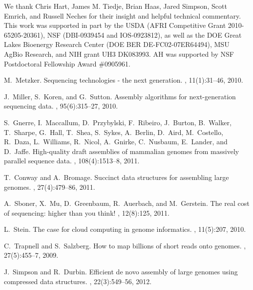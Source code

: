 \documentclass{pnastwo}
\begin{document}
\begin{article}
\begin{acknowledgments}
We thank Chris Hart, James M. Tiedje, Brian Haas, Jared Simpson, Scott
Emrich, and Russell Neches for their insight and helpful technical
commentary.  This work was supported in part by the USDA (AFRI
Competitive Grant 2010-65205-20361), NSF (DBI-0939454 and
IOS-0923812), as well as the DOE Great Lakes Bioenergy Research Center
(DOE BER DE-FC02-07ER64494), MSU AgBio Research, and NIH grant UH3
DK083993.  AH was supported by NSF Postdoctoral Fellowship Award
\#0905961.

\end{acknowledgments}

\begin{thebibliography}{10}

M.~Metzker.
\newblock Sequencing technologies - the next generation.
, 11(1):31--46, 2010.

J.~Miller, S.~Koren, and G.~Sutton.
\newblock Assembly algorithms for next-generation sequencing data.
, 95(6):315--27, 2010.

S.~Gnerre, I.~Maccallum, D.~Przybylski, F.~Ribeiro, J.~Burton, B.~Walker,
  T.~Sharpe, G.~Hall, T.~Shea, S.~Sykes, A.~Berlin, D.~Aird, M.~Costello,
  R.~Daza, L.~Williams, R.~Nicol, A.~Gnirke, C.~Nusbaum, E.~Lander, and
  D.~Jaffe.
\newblock High-quality draft assemblies of mammalian genomes from massively
  parallel sequence data.
, 108(4):1513--8, 2011.

T.~Conway and A.~Bromage.
\newblock Succinct data structures for assembling large genomes.
, 27(4):479--86, 2011.

A.~Sboner, X.~Mu, D.~Greenbaum, R.~Auerbach, and M.~Gerstein.
\newblock The real cost of sequencing: higher than you think!
, 12(8):125, 2011.

L.~Stein.
\newblock The case for cloud computing in genome informatics.
, 11(5):207, 2010.

C.~Trapnell and S.~Salzberg.
\newblock How to map billions of short reads onto genomes.
, 27(5):455--7, 2009.

J.~Simpson and R.~Durbin.
\newblock Efficient de novo assembly of large genomes using compressed data
  structures.
, 22(3):549--56, 2012.


\end{thebibliography}
\end{article}
\end{document}
